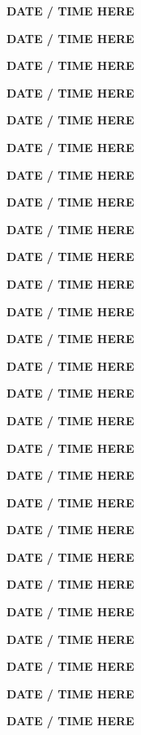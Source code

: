 \documentclass[12pt]{extbook}
\newcommand{\abstract}[2]{{
\begin{center}
\bfseries #1
\end{center}}
\par
}
\begin{document}
\clearpage

\abstract{DATE / TIME HERE}{abstracts/Blanc}
\abstract{DATE / TIME HERE}{abstracts/Brennwald}
\abstract{DATE / TIME HERE}{abstracts/Currle}
\abstract{DATE / TIME HERE}{abstracts/Daskalopoulou}
\abstract{DATE / TIME HERE}{abstracts/Dutoit}
\abstract{DATE / TIME HERE}{abstracts/Engelhardt}
\abstract{DATE / TIME HERE}{abstracts/Finger}
\abstract{DATE / TIME HERE}{abstracts/Giroud} %
\abstract{DATE / TIME HERE}{abstracts/GroegerTrampe}
\abstract{DATE / TIME HERE}{abstracts/Iwe}
\abstract{DATE / TIME HERE}{abstracts/Jacops}
\abstract{DATE / TIME HERE}{abstracts/Kimani}
\abstract{DATE / TIME HERE}{abstracts/Kipfer}
\abstract{DATE / TIME HERE}{abstracts/vanLeeuw} %
\abstract{DATE / TIME HERE}{abstracts/Lightfoot}
\abstract{DATE / TIME HERE}{abstracts/Marion}
\abstract{DATE / TIME HERE}{abstracts/Mtili}
\abstract{DATE / TIME HERE}{abstracts/Musy}
\abstract{DATE / TIME HERE}{abstracts/Ortega}
\abstract{DATE / TIME HERE}{abstracts/Picard}
\abstract{DATE / TIME HERE}{abstracts/Roques}
\abstract{DATE / TIME HERE}{abstracts/Slagter}
\abstract{DATE / TIME HERE}{abstracts/Strauch_Zimmer}
\abstract{DATE / TIME HERE}{abstracts/Tomonaga}
\abstract{DATE / TIME HERE}{abstracts/vanRooyen}
\abstract{DATE / TIME HERE}{abstracts/Wang}
\abstract{DATE / TIME HERE}{abstracts/Zhao}


\end{document}
